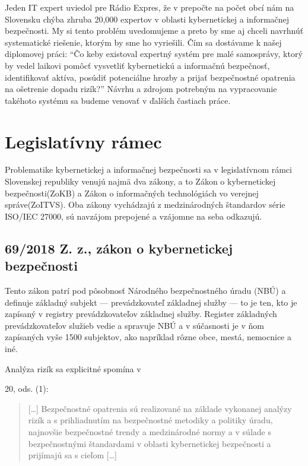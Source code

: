 
Jeden IT expert uviedol pre Rádio Expres\cite{it_expert_radio_express}, že v prepočte na počet obcí nám na Slovensku chýba
zhruba 20,000 expertov v oblasti kybernetickej a informačnej bezpečnosti. My si tento problém uvedomujeme a preto by sme aj chceli navrhnúť systematické
riešenie, ktorým by sme ho vyriešili. Čím sa dostávame k našej diplomovej práci: \enquote{Čo keby existoval expertný systém pre malé samosprávy, ktorý by
vedel laikovi pomôcť vysvetliť kybernetickú a informačnú bezpečnosť, identifikovať aktíva, posúdiť potenciálne hrozby a prijať bezpečnostné opatrenia na
ošetrenie dopadu rizík?} Návrhu a zdrojom potrebným na vypracovanie takéhoto systému sa budeme venovať v ďalších častiach práce.

\section{Legislatívny rámec}

Problematike kybernetickej a informačnej bezpečnosti sa v legislatívnom rámci Slovenskej republiky venujú najmä dva zákony, a to
Zákon o kybernetickej bezpečnosti\cite{sk_69_2018}(ZoKB) a Zákon o informačných technológiách vo verejnej správe\cite{sk_95_2019}(ZoITVS).
Oba zákony vychádzajú z medzinárodných štandardov série ISO/IEC 27000, sú navzájom prepojené a vzájomne na seba odkazujú.

\subsection*{69/2018 Z. z., zákon o kybernetickej bezpečnosti}
Tento zákon patrí pod pôsobnosť Národného bezpečnostného úradu (NBÚ) a definuje základný subjekt --- prevádzkovateľ základnej služby --- to je ten,
kto je zapísaný v registry prevádzkovateľov základnej služby. Register základných prevádzkovateľov služieb vedie a spravuje NBÚ a v súčasnosti je
v ňom zapísaných vyše 1500 subjektov, ako napríklad rôzne obce, mestá, nemocnice a iné.

Analýza rizík sa explicitné spomína v \par20, ods. (1):
\begin{quote}
[\ldots] Bezpečnostné opatrenia sú realizované na základe vykonanej analýzy rizík a s prihliadnutím na bezpečnostné metodiky a politiky úradu, najnovšie bezpečnostné
trendy a medzinárodné normy a v súlade s bezpečnostnými štandardami v oblasti kybernetickej bezpečnosti a prijímajú sa s cieľom [\ldots]
\end{quote}

